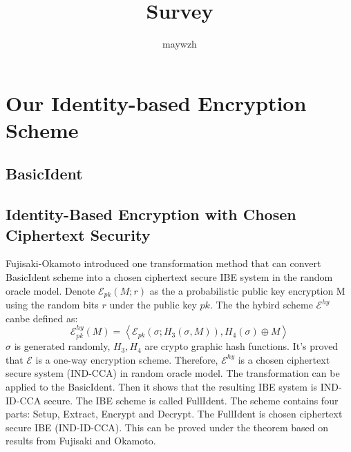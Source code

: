 \documentclass[11pt,en]{elegantpaper}
\title{Survey}
\author{maywzh}
\institute{CCNU-UOW Joint Institude}
\date{}
\begin{document}
\maketitle

\begin{abstract}

\end{abstract}


\section{Our Identity-based Encryption Scheme}

\subsection{BasicIdent}
\subsection{Identity-Based Encryption with Chosen Ciphertext Security}
Fujisaki-Okamoto introduced one transformation method that can convert BasicIdent scheme into a chosen ciphertext secure IBE system in the random oracle model. Denote $\mathcal{E}_{pk}(M;r)$ as the a probabilistic public key encryption M using the random bits $r$ under the public key $pk$. The the hybird scheme $\mathcal{E}^{hy}$ canbe defined as:
$$
\mathcal{E}_{p k}^{h y}(M)=\left\langle\mathcal{E}_{p k}\left(\sigma ; H_{3}(\sigma, M)\right), H_{4}(\sigma) \oplus M\right\rangle
$$
$\sigma$ is generated randomly, $H_3,H_4$ are crypto graphic hash functions. It's proved that $\mathcal{E}$ is a one-way encryption scheme. Therefore, $\mathcal{E}^{hy}$ is a chosen ciphertext secure system (IND-CCA) in random oracle model. The transformation can be applied to the BasicIdent. Then it shows that the resulting IBE system is IND-ID-CCA secure. The IBE scheme is called FullIdent. The scheme contains four parts: Setup, Extract, Encrypt and Decrypt. The FullIdent is chosen ciphertext secure IBE (IND-ID-CCA). This can be proved under the theorem based on results from Fujisaki and Okamoto. 
\end{document}
